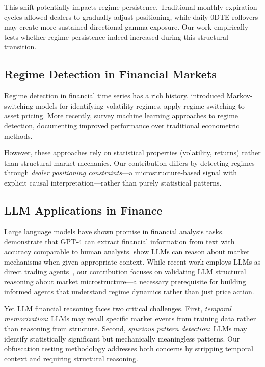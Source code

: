 This shift potentially impacts regime persistence. Traditional monthly expiration cycles allowed dealers to gradually adjust positioning, while daily 0DTE rollovers may create more sustained directional gamma exposure. Our work empirically tests whether regime persistence indeed increased during this structural transition.

\subsection{Regime Detection in Financial Markets}

Regime detection in financial time series has a rich history. \citet{hamilton1989new} introduced Markov-switching models for identifying volatility regimes. \citet{ang2002regime} apply regime-switching to asset pricing. More recently, \citet{nystrup2020regime} survey machine learning approaches to regime detection, documenting improved performance over traditional econometric methods.

However, these approaches rely on statistical properties (volatility, returns) rather than structural market mechanics. Our contribution differs by detecting regimes through \textit{dealer positioning constraints}—a microstructure-based signal with explicit causal interpretation—rather than purely statistical patterns.

\subsection{LLM Applications in Finance}

Large language models have shown promise in financial analysis tasks. \citet{lopez2023can} demonstrate that GPT-4 can extract financial information from text with accuracy comparable to human analysts. \citet{kim2024financial} show LLMs can reason about market mechanisms when given appropriate context. While recent work employs LLMs as direct trading agents~\citep{yang2024tradingagents}, our contribution focuses on validating LLM structural reasoning about market microstructure---a necessary prerequisite for building informed agents that understand regime dynamics rather than just price action.

Yet LLM financial reasoning faces two critical challenges. First, \textit{temporal memorization}: LLMs may recall specific market events from training data rather than reasoning from structure. Second, \textit{spurious pattern detection}: LLMs may identify statistically significant but mechanically meaningless patterns. Our obfuscation testing methodology addresses both concerns by stripping temporal context and requiring structural reasoning.

